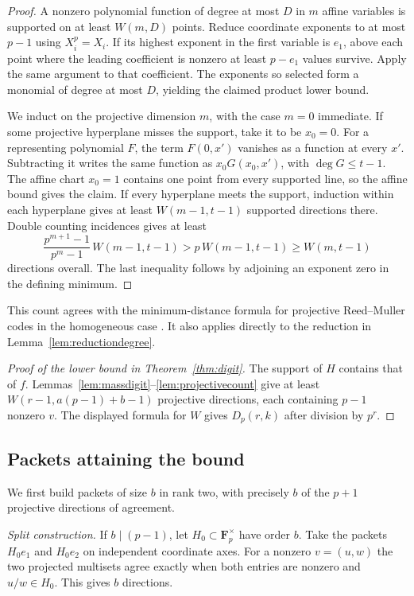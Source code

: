\documentclass[11pt,letterpaper]{article}
\newcommand{\Fp}{\mathbf F_p}
\theoremstyle{remark}
\begin{document}
\begin{proof}
A nonzero polynomial function of degree at most $D$ in $m$ affine variables is supported on at least $W(m,D)$ points. Reduce coordinate exponents to at most $p-1$ using $X_i^p=X_i$. If its highest exponent in the first variable is $e_1$, above each point where the leading coefficient is nonzero at least $p-e_1$ values survive. Apply the same argument to that coefficient. The exponents so selected form a monomial of degree at most $D$, yielding the claimed product lower bound.

We induct on the projective dimension $m$, with the case $m=0$ immediate. If some projective hyperplane misses the support, take it to be $x_0=0$. For a representing polynomial $F$, the term $F(0,x')$ vanishes as a function at every $x'$. Subtracting it writes the same function as $x_0G(x_0,x')$, with $\deg G\le t-1$. The affine chart $x_0=1$ contains one point from every supported line, so the affine bound gives the claim. If every hyperplane meets the support, induction within each hyperplane gives at least $W(m-1,t-1)$ supported directions there. Double counting incidences gives at least
\[
    \frac{p^{m+1}-1}{p^m-1}\,W(m-1,t-1)
    >p\,W(m-1,t-1)\ge W(m,t-1)
\]
directions overall. The last inequality follows by adjoining an exponent zero in the defining minimum.
\end{proof}

This count agrees with the minimum-distance formula for projective Reed--Muller codes in the homogeneous case \cite{GL}. It also applies directly to the reduction in Lemma~\ref{lem:reductiondegree}.

\begin{proof}[Proof of the lower bound in Theorem~\ref{thm:digit}]
The support of $H$ contains that of $f$. Lemmas~\ref{lem:massdigit}--\ref{lem:projectivecount} give at least $W(r-1,a(p-1)+b-1)$ projective directions, each containing $p-1$ nonzero $v$. The displayed formula for $W$ gives $D_p(r,k)$ after division by $p^r$.
\end{proof}

\subsection{Packets attaining the bound}

We first build packets of size $b$ in rank two, with precisely $b$ of the $p+1$ projective directions of agreement.

\emph{Split construction.} If $b\mid(p-1)$, let $H_0\subset\Fp^\times$ have order $b$. Take the packets $H_0 e_1$ and $H_0 e_2$ on independent coordinate axes. For a nonzero $v=(u,w)$ the two projected multisets agree exactly when both entries are nonzero and $u/w\in H_0$. This gives $b$ directions.
\end{document}
